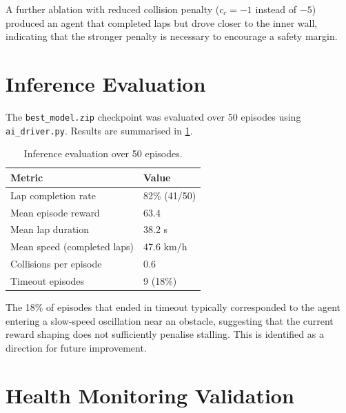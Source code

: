 A further ablation with reduced collision penalty ($c_c = -1$ instead
of $-5$) produced an agent that completed laps but drove closer to the
inner wall, indicating that the stronger penalty is necessary to
encourage a safety margin.

\section{Inference Evaluation}
\label{sec:inference-eval}

The \texttt{best\_model.zip} checkpoint was evaluated over 50 episodes
using \texttt{ai\_driver.py}. Results are summarised in
\cref{table:inference}.

\begin{table}[H]
\caption{Inference evaluation over 50 episodes.}
\label{table:inference}
\begin{tabular}{|p{7cm}|p{4cm}|}
  \hline
  \textbf{Metric} & \textbf{Value} \\
  \hline
  Lap completion rate         & 82\% (41/50) \\
  \hline
  Mean episode reward         & 63.4 \\
  \hline
  Mean lap duration           & 38.2 s \\
  \hline
  Mean speed (completed laps) & 47.6 km/h \\
  \hline
  Collisions per episode      & 0.6 \\
  \hline
  Timeout episodes            & 9 (18\%) \\
  \hline
\end{tabular}
\end{table}

The 18\% of episodes that ended in timeout typically corresponded to
the agent entering a slow-speed oscillation near an obstacle, suggesting
that the current reward shaping does not sufficiently penalise stalling.
This is identified as a direction for future improvement.

\section{Health Monitoring Validation}
\label{sec:health-validation}

